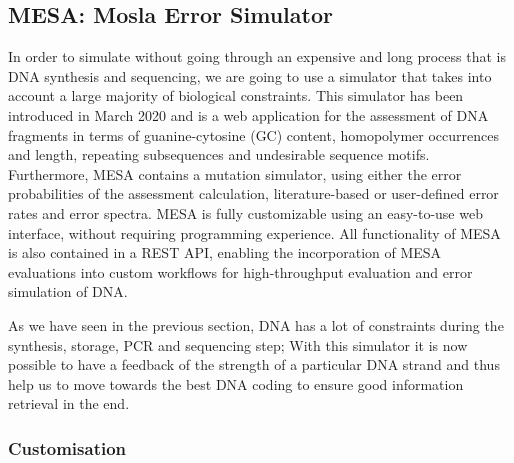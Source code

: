 \subsection{MESA: Mosla Error Simulator}

In order to simulate without going through an expensive and long process that is DNA synthesis and sequencing, we are going to use a simulator that takes into account a large majority of biological constraints.
This simulator has been introduced \cite{bib:10.1093/bioinformatics/btaa140} in March 2020 and is a web application for the assessment of DNA fragments in terms of guanine-cytosine (GC) content, homopolymer occurrences and length, repeating subsequences and undesirable sequence motifs.
Furthermore, MESA contains a mutation simulator, using either the error probabilities of the assessment calculation, literature-based or user-defined error rates and error spectra. MESA is fully customizable using an easy-to-use web interface, without requiring programming experience. All functionality of MESA is also contained in a REST API, enabling the incorporation of MESA evaluations into custom workflows for high-throughput evaluation and error simulation of DNA.

As we have seen in the previous section, DNA has a lot of constraints during the synthesis, storage, PCR and sequencing step; With this simulator it is now possible to have a feedback of the strength of a particular DNA strand and thus help us to move towards the best DNA coding to ensure good information retrieval in the end.

\subsubsection{Customisation}


